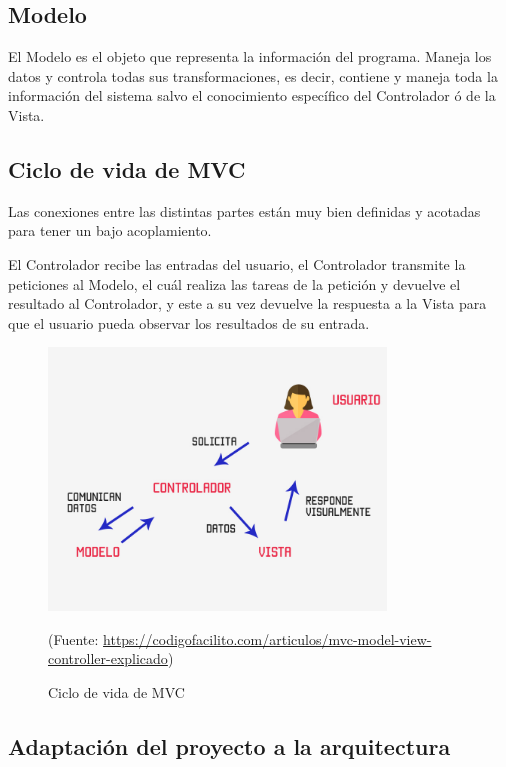 \subsection*{Modelo}

El Modelo es el objeto que representa la información del programa. Maneja los datos y controla todas sus transformaciones, es decir, contiene y maneja toda la información del sistema salvo el conocimiento específico del Controlador ó de la Vista.

\subsection{Ciclo de vida de MVC}

Las conexiones entre las distintas partes están muy bien definidas y acotadas para tener un bajo acoplamiento.

El Controlador recibe las entradas del usuario, el Controlador transmite la peticiones al Modelo, el cuál realiza las tareas de la petición y devuelve el resultado al Controlador, y este a su vez devuelve la respuesta a la Vista para que el usuario pueda observar los resultados de su entrada.

\begin{figure}[h]
    \centering
    \includegraphics[width=0.8\textwidth]{imagenes/04_Analisis/ciclo_vida_MVC.jpg}
    \begin{center}
        (Fuente: \url{https://codigofacilito.com/articulos/mvc-model-view-controller-explicado})
    \end{center}
    \caption{Ciclo de vida de MVC}
\end{figure}

\subsection{Adaptación del proyecto a la arquitectura}


